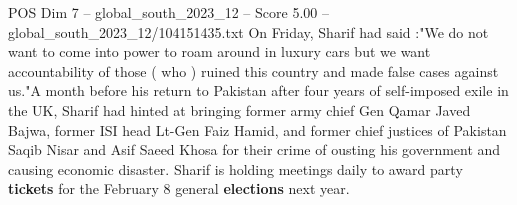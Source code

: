\begin{textsample}{POS Dim 7 – global\_south\_2023\_12 – Score 5.00 – global\_south\_2023\_12/104151435.txt}
On Friday, Sharif had said :"We do not want to come into power to roam around in luxury cars but we want accountability of those ( who ) ruined this country and made false cases against us."A month before his return to Pakistan after four years of self-imposed exile in the UK, Sharif had hinted at bringing former army chief Gen Qamar Javed Bajwa, former ISI head Lt-Gen Faiz Hamid, and former chief justices of Pakistan Saqib Nisar and Asif Saeed Khosa for their crime of ousting his government and causing economic disaster.
Sharif is holding meetings daily to award party \textbf{tickets} for the February 8 general \textbf{elections} next year.

\end{textsample}

